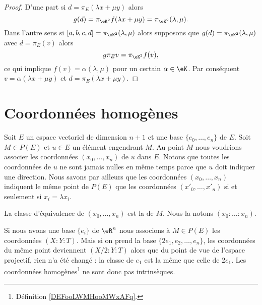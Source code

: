 \begin{proof}
	D'une part si \( d=\pi_E(\lambda x+\mu y)\) alors
	\begin{equation}
		g(d)=\pi_{\eK^2}f(\lambda x+\mu y)=\pi_{\eK^2}(\lambda,\mu).
	\end{equation}
	Dans l'autre sens si \( [a,b,c,d]=\pi_{\eK^2}(\lambda,\mu)\) alors supposons que \( g(d)=\pi_{\eK^2}(\lambda,\mu)\) avec \( d=\pi_E(v)\) alors
	\begin{equation}
		g\pi_Ev=\pi_{\eK^2}f(v),
	\end{equation}
	ce qui implique \( f(v)=\alpha(\lambda,\mu)\) pour un certain \( \alpha\in \eK\). Par conséquent \( v=\alpha(\lambda x+\mu y)\) et \( d=\pi_E(\lambda x+\mu y)\).
\end{proof}

\section{Coordonnées homogènes}

Soit \( E\) un espace vectoriel de dimension \( n+1\) et une base \( \{ e_0,\ldots, e_n \}\) de \( E\). Soit \( M\in P(E)\) et \( u\in E\) un élément engendrant \( M\). Au point \( M\) nous voudrions associer les coordonnées \( (x_0,\ldots, x_n)\) de \( u\) dans \( E\). Notons que toutes les coordonnées de \( u\) ne sont jamais nulles en même temps parce que \( u\) doit indiquer une direction. Nous savons par ailleurs que les coordonnées \( (x_0,\ldots, x_n)\) indiquent le même point de \( P(E)\) que les coordonnées \( (x'_0,\ldots, x'_n)\) si et seulement si \( x_i=\lambda x_i\).

\begin{definition}      \label{DEFooLWMHooMWxAFq}
	La classe d'équivalence de \( (x_0,\ldots, x_n)\) est la  de \( M\). Nous la notons \( (x_0:\ldots :x_n)\).
\end{definition}

Si nous avons une base \( \{ e_i \}\) de \( \eR^n\) nous associons à \( M\in P(E)\) les coordonnées \( (X:Y:T)\). Mais si on prend la base \( \{ 2e_1,e_2,\ldots, e_n \}\), les coordonnées du même point deviennent \( (X/2:Y:T)\) alors que du point de vue de l'espace projectif, rien n'a été changé : la classe de \( e_1\) est la même que celle de \( 2e_1\). Les coordonnées homogènes\footnote{Définition \ref{DEFooLWMHooMWxAFq}.} ne sont donc pas intrinsèques.

